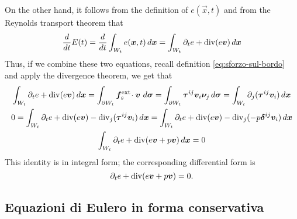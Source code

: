 On the other hand, it follows from the definition of $e(\vec{x},t)$ and
from the Reynolds transport theorem that
\[
\frac{d}{dt} E(t)
	= \frac{d}{dt} \int_{W_t} e(\bm{x},t) \, d\bm{x}
	= \int_{W_t} \partial_t e + \operatorname{div}(e \bm{v}) \, d\bm{x}
\]
Thus, if we combine these two equations, recall definition 
\eqref{eq:sforzo-sul-bordo} and apply the divergence theorem, we get that
\begin{gather*}
\int_{W_t} \partial_t e + \operatorname{div}(e \bm{v}) \, d\bm{x}
	= \int_{\partial W_t} \bm{f}_s^{\text{ext}} \!\cdot \bm{v} \, \, d\bm{\sigma}
	= \int_{\partial W_t} \bm{\tau}^{ij} \bm{v}_i \bm{\nu}_j \, d\bm{\sigma}
	= \int_{W_t} \partial_j (\bm{\tau}^{ij} \bm{v}_i) \, d\bm{x} \\
0
	= \int_{W_t} \partial_t e + \operatorname{div}(e \bm{v})
	- \operatorname{div}_j(\bm{\tau}^{ij} \bm{v}_i) \, d\bm{x}
	= \int_{W_t} \partial_t e + \operatorname{div}(e \bm{v})
	- \operatorname{div}_j(-p \bm{\delta}^{ij} \bm{v}_i) \, d\bm{x} \\
\int_{W_t} \partial_t e + \operatorname{div}(e \bm{v} + p \bm{v}) \, d\bm{x} = 0
\end{gather*}
This identity is in integral form; the corresponding differential form is
\begin{equation} \label{eq:bilancio-energia}
\partial_t e + \operatorname{div}(e \bm{v} + p \bm{v}) = 0.
\end{equation}

\subsection*{Equazioni di Eulero in forma conservativa}

